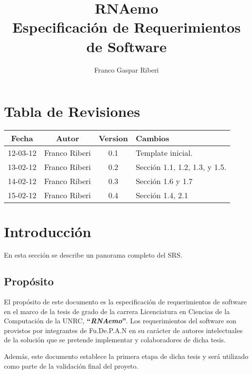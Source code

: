 \documentclass[10pt,a4paper,english,spanish]{article}
\title{\textbf{RNAemo}\\ \vspace{0.45cm} Especificación de Requerimientos de Software} %
\author{Franco Gaspar Riberi}
\newcommand{\rnaemo}{\textbf{\emph{RNAemo}}}
\begin{document}
\maketitle\pagebreak{}\tableofcontents{}\pagebreak{}

\section*{Tabla de Revisiones}
	
\begin{center}
\begin{tabular}{| c | c | c | l |}
	\hline
	{\bf Fecha} & {\bf Autor} & {\bf Version} & {\bf Cambios}\\
	\hline
	\hline		
	12-03-12 & Franco Riberi & 0.1 & Template inicial.\\\hline
	13-02-12 & Franco Riberi & 0.2 & Sección 1.1, 1.2, 1.3,  y 1.5.\\\hline
	14-02-12 & Franco Riberi & 0.3 & Sección 1.6 y 1.7\\\hline
	15-02-12 & Franco Riberi & 0.4 & Sección 1.4, 2.1 \\\hline
\end{tabular}
\end{center}
\newpage

\section{Introducción}
En esta sección se describe un panorama completo del SRS.

\subsection{Propósito}
\par El propósito de este documento es la especificación de requerimientos
de software en el marco de la tesis de grado de la carrera Licenciatura en
Ciencias de la Computación de la UNRC, \textbf{``}\rnaemo\textbf{''}.  Los requerimientos 
del software son provistos por integrantes de Fu.De.P.A.N en su carácter de autores
intelectuales de la solución que se pretende implementar y colaboradores
de dicha tesis.
\par Además, este documento establece la primera etapa de dicha tesis y será utilizado
como parte de la validación final del proyeto.
\end{document}
